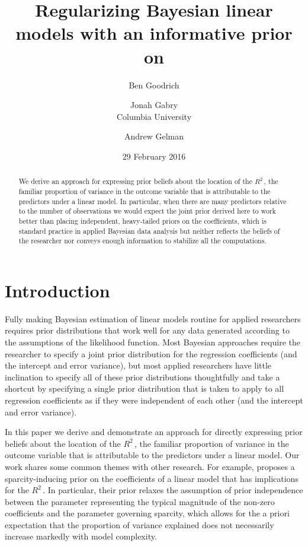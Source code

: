 \documentclass[11pt]{article}
\title{\bf Regularizing Bayesian linear models with an informative prior on \Rsq
    \vspace{.1in}}
\author{Ben Goodrich
    \and Jonah Gabry \\[.2in] Columbia University
    \and Andrew Gelman
    \vspace{.1in}}
\date{29 February 2016
    \vspace{-.2in}}
\newcommand{\Rsq}{$R^2\,$}
\begin{document}
\maketitle
\thispagestyle{empty}

\begin{abstract}
\noindent We derive an approach for expressing prior beliefs about the location
of the \Rsq, the familiar proportion of variance in the outcome variable that is
attributable to the predictors under a linear model. In particular, when there
are many predictors relative to the number of observations we would expect the
joint prior derived here to work better than placing independent, heavy-tailed
priors on the coefficients, which is  standard practice in applied Bayesian data
analysis but neither reflects the beliefs of the researcher nor conveys enough
information to stabilize all the computations.
\end{abstract}


\section{Introduction}

Fully making Bayesian estimation of linear models routine for applied
researchers requires prior distributions that work well for any data generated
according to the assumptions of the likelihood function. Most Bayesian
approaches require the researcher to specify a joint prior distribution for the
regression coefficients (and the intercept and error variance), but most applied
researchers have little inclination to specify all of these prior distributions
thoughtfully and take a shortcut by specifying a single prior distribution that
is taken to apply to all regression coefficients as if they were independent of
each other (and the intercept and error variance).

In this paper we derive and demonstrate an approach for directly expressing
prior beliefs about the location of the \Rsq, the familiar proportion of
variance in the outcome variable that is attributable to the predictors under a
linear model. Our work shares some common themes with other research. For
example,  proposes a sparcity-inducing prior on the
coefficients of a linear model that has implications for the \Rsq. In
particular, their prior relaxes the assumption of prior independence between the
parameter representing the typical magnitude of the non-zero coefficients and
the parameter governing sparcity, which allows for the a priori expectation that
the proportion of variance explained does not necessarily increase markedly with
model complexity.
\end{document}
